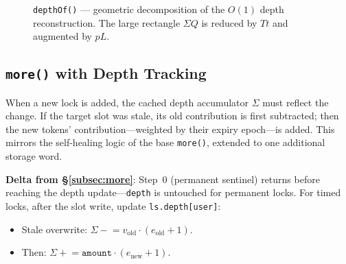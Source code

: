 \documentclass[10pt,a4paper,twocolumn]{article}
\theoremstyle{definition}
\theoremstyle{plain}
\theoremstyle{remark}
\begin{document}
\begin{figure}[htbp]
\centering
{}
\caption{\texttt{depthOf()} --- geometric decomposition of the $O(1)$ depth reconstruction. The large rectangle $\Sigma Q$ is reduced by $Tt$ and augmented by $pL$.}
\label{fig:depthof-geometry}
\end{figure}

\subsection{\texttt{more()} with Depth Tracking}
\label{subsec:more-depth}

When a new lock is added, the cached depth accumulator $\Sigma$ must reflect the change.  If the target slot was stale, its old contribution is first subtracted; then the new tokens' contribution---weighted by their expiry epoch---is added.  This mirrors the self-healing logic of the base \texttt{more()}, extended to one additional storage word.

\textbf{Delta from \S\ref{subsec:more}}: Step~0 (permanent sentinel) returns before reaching the depth update---\texttt{depth} is untouched for permanent locks. For timed locks, after the slot write, update \texttt{ls.depth[user]}:
\begin{itemize}[nosep]
\item Stale overwrite: $\Sigma \mathrel{-}= v_{\text{old}} \cdot (e_{\text{old}}{+}1)$.
\item Then: $\Sigma \mathrel{+}= \texttt{amount} \cdot (e_{\text{new}}{+}1)$.
\end{itemize}
\end{document}
